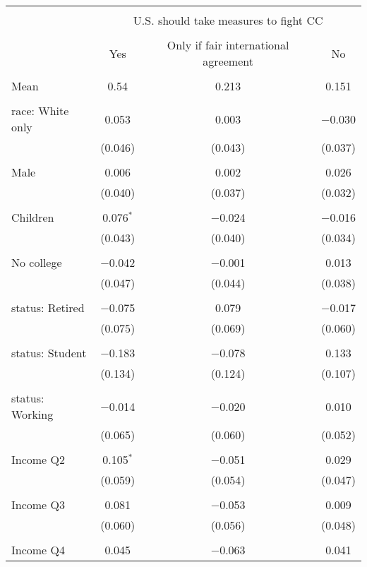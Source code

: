 
\begin{tabular}{@{\extracolsep{5pt}}lccc} 
\\[-1.8ex]\hline 
\hline \\[-1.8ex] 
 & \multicolumn{3}{c}{U.S. should take measures to fight CC} \\ 
\cline{2-4} 
\\[-1.8ex] & Yes & Only if fair international agreement & No \\ 
\hline \\[-1.8ex] 
 Mean & 0.54 & 0.213 & 0.151  \\ \hline \\[-1.8ex] race: White only & 0.053 & 0.003 & $-$0.030 \\ 
  & (0.046) & (0.043) & (0.037) \\ 
  & & & \\ 
 Male & 0.006 & 0.002 & 0.026 \\ 
  & (0.040) & (0.037) & (0.032) \\ 
  & & & \\ 
 Children & 0.076$^{*}$ & $-$0.024 & $-$0.016 \\ 
  & (0.043) & (0.040) & (0.034) \\ 
  & & & \\ 
 No college & $-$0.042 & $-$0.001 & 0.013 \\ 
  & (0.047) & (0.044) & (0.038) \\ 
  & & & \\ 
 status: Retired & $-$0.075 & 0.079 & $-$0.017 \\ 
  & (0.075) & (0.069) & (0.060) \\ 
  & & & \\ 
 status: Student & $-$0.183 & $-$0.078 & 0.133 \\ 
  & (0.134) & (0.124) & (0.107) \\ 
  & & & \\ 
 status: Working & $-$0.014 & $-$0.020 & 0.010 \\ 
  & (0.065) & (0.060) & (0.052) \\ 
  & & & \\ 
 Income Q2 & 0.105$^{*}$ & $-$0.051 & 0.029 \\ 
  & (0.059) & (0.054) & (0.047) \\ 
  & & & \\ 
 Income Q3 & 0.081 & $-$0.053 & 0.009 \\ 
  & (0.060) & (0.056) & (0.048) \\ 
  & & & \\ 
 Income Q4 & 0.045 & $-$0.063 & 0.041 \\ 

\end{tabular}
